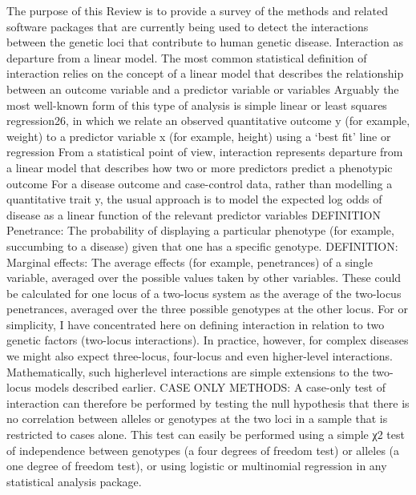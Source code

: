 The purpose of this Review is to provide a survey of the methods and related software packages that are currently being used to detect the interactions between the genetic loci that contribute to human genetic disease. \cite{cordell2009detecting}
Interaction as departure from a linear model. The most common statistical definition of interaction relies on the concept of a linear model that describes the relationship between an outcome variable and a predictor variable or variables \cite{cordell2009detecting}
Arguably the most well-known form of this type of analysis is simple linear or least squares regression26, in which we relate an observed quantitative outcome y (for example, weight) to a predictor variable x (for example, height) using a `best fit' line or regression \cite{cordell2009detecting}
From a statistical point of view, interaction represents departure from a linear model that describes how two or more predictors predict a phenotypic outcome \cite{cordell2009detecting}
For a disease outcome and case-control data, rather than modelling a quantitative trait y, the usual approach is to model the expected log odds of disease as a linear function of the relevant predictor variables \cite{cordell2009detecting}
DEFINITION Penetrance: The probability of displaying a particular phenotype (for example, succumbing to a disease) given that one has a specific genotype. \cite{cordell2009detecting}
DEFINITION: Marginal effects: The average effects (for example, penetrances) of a single variable, averaged over the possible values taken by other variables. These could be calculated for one locus of a two-locus system as the average of the two-locus penetrances, averaged over the three possible genotypes at the other locus. \cite{cordell2009detecting}
For or simplicity, I have concentrated here on defining interaction in relation to two genetic factors (two-locus interactions). In practice, however, for complex diseases we might also expect three-locus, four-locus and even higher-level interactions. Mathematically, such higherlevel interactions are simple extensions to the two-locus models described earlier.  \cite{cordell2009detecting}
CASE ONLY METHODS:
	A case-only test of interaction can therefore be performed by testing the null hypothesis that there is no correlation between alleles or genotypes at the two loci in a sample that is restricted to cases alone. This test can easily be performed using a simple χ2 test of independence between genotypes (a four degrees of freedom test) or alleles (a one degree of freedom test), or using logistic or multinomial regression in any statistical analysis package. \cite{cordell2009detecting}
